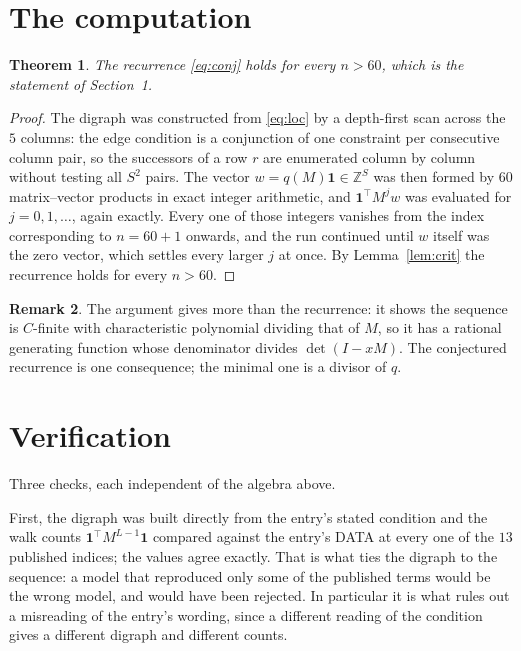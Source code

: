 \documentclass[11pt,a4paper]{article}
\theoremstyle{plain}
\newtheorem{theorem}{Theorem}
\theoremstyle{definition}
\newtheorem{remark}[theorem]{Remark}
\begin{document}
\section{The computation}

\begin{theorem}
The recurrence \eqref{eq:conj} holds for every $n>60$, which is the statement of
Section~1.
\end{theorem}

\begin{proof}
The digraph was constructed from \eqref{eq:loc} by a depth-first scan across the $5$
columns: the edge condition is a conjunction of one constraint per consecutive column
pair, so the successors of a row $r$ are enumerated column by column without testing all
$S^2$ pairs. The vector $w=q(M)\mathbf{1}\in\mathbb{Z}^{S}$ was then formed by $60$
matrix--vector products in exact integer arithmetic, and $\mathbf{1}^{\!\top}M^{j}w$ was
evaluated for $j=0,1,\dots$, again exactly. Every one of those integers vanishes from the
index corresponding to $n=60+1$ onwards, and the run continued until $w$ itself was the
zero vector, which settles every larger $j$ at once. By Lemma~\ref{lem:crit} the recurrence
holds for every $n>60$.
\end{proof}

\begin{remark}
The argument gives more than the recurrence: it shows the sequence is $C$-finite with
characteristic polynomial dividing that of $M$, so it has a rational generating function
whose denominator divides $\det(I-xM)$. The conjectured recurrence is one consequence; the
minimal one is a divisor of $q$.
\end{remark}

\section{Verification}

Three checks, each independent of the algebra above.

First, the digraph was built directly from the entry's stated condition and the walk counts
$\mathbf{1}^{\!\top}M^{L-1}\mathbf{1}$ compared against the entry's DATA at
every one of the $13$ published indices; the values agree exactly. That is what ties
the digraph to the sequence: a model that reproduced only some of the published terms would
be the wrong model, and would have been rejected. In particular it is what rules out a
misreading of the entry's wording, since a different reading of the condition gives a
different digraph and different counts.
\end{document}
